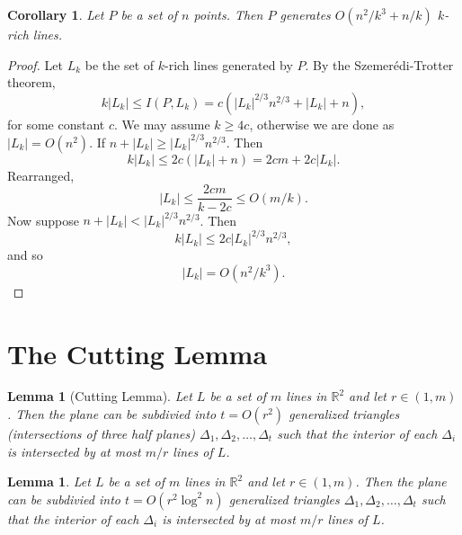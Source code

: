 \documentclass[12pt,reqno]{amsart}
\newtheorem{lemma}[theorem]{Lemma}
\newtheorem{corollary}[theorem]{Corollary}
\theoremstyle{definition}
\theoremstyle{remark}
\renewcommand{\leq}{\leqslant}
\renewcommand{\geq}{\geqslant}
\def\R{\mathbb{R}}
\numberwithin{equation}{section}
\begin{document}
\begin{corollary}\label{cor:szemeredi-trotter}
	Let $P$ be a set of $n$ points. Then $P$ generates $O(n^2/k^3 + n/k)$ $k$-rich lines.
\end{corollary}

\begin{proof}
	Let $L_k$ be the set of $k$-rich lines generated by $P$. By the Szemerédi-Trotter theorem, 
	\[
		k|L_k| \leq I(P, L_k) = c(|L_k|^{2/3}n^{2/3} + |L_k| + n),
	\]
	for some constant $c$. We may assume $k \geq 4c$, otherwise we are done as $|L_k| = O(n^2)$. If $n + |L_k| \geq |L_k|^{2/3}n^{2/3}$. Then 
	\[
		k|L_k| \leq 2c(|L_k| + n) = 2cm + 2c|L_k|.
	\]
	Rearranged,
	\[
		|L_k| \leq \frac{2cm}{k - 2c} \leq O(m/k).
	\]
	Now suppose $n + |L_k| < |L_k|^{2/3}n^{2/3}$. Then 
	\[
		k|L_k| \leq 2c|L_k|^{2/3}n^{2/3},
	\]
	and so 
	\[
		|L_k|= O(n^{2}/k^3). 
	\]
\end{proof}

\newpage

\section{The Cutting Lemma}

\begin{lemma}[Cutting Lemma]
	Let $L$ be a set of $m$ lines in $\R^2$ and let $r \in (1, m)$. Then the plane can be subdivied into $t = O(r^2)$ generalized triangles (intersections of three half planes) $\Delta_1, \Delta_2, \ldots, \Delta_t$ such that the interior of each $\Delta_i$ is intersected by at most $m/r$ lines of $L$. 
\end{lemma}

\begin{lemma}
	Let $L$ be a set of $m$ lines in $\R^2$ and let $r \in (1, m)$. Then the plane can be subdivied into $t = O(r^2\log^2 n)$ generalized triangles $\Delta_1, \Delta_2, \ldots, \Delta_t$ such that the interior of each $\Delta_i$ is intersected by at most $m/r$ lines of $L$. 
\end{lemma}
\end{document}
